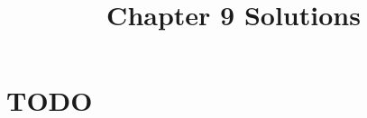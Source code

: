 \documentclass[12pt]{article}
\title{Chapter 9 Solutions}
\begin{document}
\section{TODO}
\end{document}

